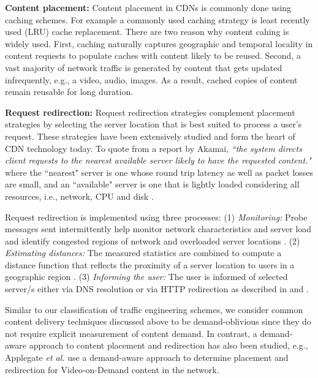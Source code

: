 \textbf{Content placement:} Content placement in CDNs is commonly done using caching schemes. For example a commonly used caching strategy is least recently used (LRU) cache replacement. There are two reason why content cahing is widely used. First, caching naturally captures geographic and temporal locality in content requests to populate caches with content likely to be reused. Second, a vast majority of network traffic is generated by content that gets updated infrequently, e.g., a video, audio, images. As a result, cached copies of content remain reusable for long duration. 


\textbf{Request redirection:} Request redirection strategies complement placement strategies by selecting the server location that is best suited to process a user's request. These strategies have been extensively studied and form the heart of CDN technology today. To quote from a report by Akamai,  \emph{``the system directs client requests to the nearest available server likely to have the requested content."} where the ``nearest" server is one whose round trip latency as well as packet losses are small, and  an ``available" server is one that is lightly loaded considering all resources, i.e., network, CPU and disk  \cite{DilleyMPPSW02}. 

Request redirection is implemented using three processes: (1) \emph{Monitoring:} Probe messages sent intermittently help monitor network characteristics and server load and identify congested regions of network and overloaded server locations \cite{oasis,donar}. (2) \emph{Estimating distances:} The measured statistics are combined to compute a distance function that reflects the proximity of a server location to users in a geographic region \cite{donar}. (3) \emph{Informing the user:} The user is informed of selected server/s either via DNS resolution or via HTTP redirection as described in  \cite{DilleyMPPSW02} and  \cite{barbir2003known}.


Similar to our classification of traffic engineering schemes, we consider common content delivery techniques discussed above to be demand-oblivious since they do not require explicit measurement of content demand. In contrast, a demand-aware approach to content placement and redirection has also been studied, e.g., Applegate \emph{et al.} use a demand-aware approach to determine placement and redirection for Video-on-Demand content in the network. 

